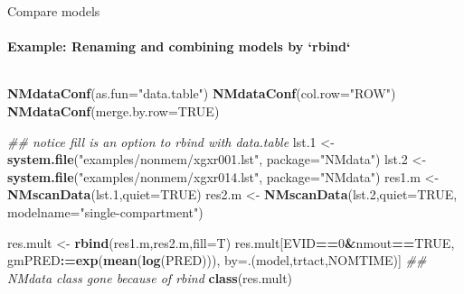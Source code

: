 \documentclass[
  8pt,
  ignorenonframetext,
  aspectratio=169]{beamer}
\newenvironment{Shaded}{\begin{snugshade}}{\end{snugshade}}
\newcommand{\CommentTok}[1]{\textcolor[rgb]{0.56,0.35,0.01}{\textit{#1}}}
\newcommand{\DataTypeTok}[1]{\textcolor[rgb]{0.13,0.29,0.53}{#1}}
\newcommand{\DecValTok}[1]{\textcolor[rgb]{0.00,0.00,0.81}{#1}}
\newcommand{\ErrorTok}[1]{\textcolor[rgb]{0.64,0.00,0.00}{\textbf{#1}}}
\newcommand{\FloatTok}[1]{\textcolor[rgb]{0.00,0.00,0.81}{#1}}
\newcommand{\KeywordTok}[1]{\textcolor[rgb]{0.13,0.29,0.53}{\textbf{#1}}}
\newcommand{\NormalTok}[1]{#1}
\newcommand{\OperatorTok}[1]{\textcolor[rgb]{0.81,0.36,0.00}{\textbf{#1}}}
\newcommand{\OtherTok}[1]{\textcolor[rgb]{0.56,0.35,0.01}{#1}}
\newcommand{\StringTok}[1]{\textcolor[rgb]{0.31,0.60,0.02}{#1}}
\begin{document}
\begin{frame}[fragile]{Compare models}
\protect\hypertarget{compare-models}{}
\framesubtitle{Example: Renaming and combining models by `rbind`}

\begin{columns}[T]
\begin{column}{0.45\textwidth}
\footnotesize

\begin{Shaded}
\begin{Highlighting}[]
\KeywordTok{NMdataConf}\NormalTok{(}\DataTypeTok{as.fun=}\StringTok{"data.table"}\NormalTok{)}
\KeywordTok{NMdataConf}\NormalTok{(}\DataTypeTok{col.row=}\StringTok{"ROW"}\NormalTok{)}
\KeywordTok{NMdataConf}\NormalTok{(}\DataTypeTok{merge.by.row=}\OtherTok{TRUE}\NormalTok{)}
\end{Highlighting}
\end{Shaded}

\begin{Shaded}
\begin{Highlighting}[]
\CommentTok{\#\# notice fill is an option to rbind with data.table}
\NormalTok{lst}\FloatTok{.1}\NormalTok{ \textless{}{-}}\StringTok{ }\KeywordTok{system.file}\NormalTok{(}\StringTok{"examples/nonmem/xgxr001.lst"}\NormalTok{,}
                     \DataTypeTok{package=}\StringTok{"NMdata"}\NormalTok{)}
\NormalTok{lst}\FloatTok{.2}\NormalTok{ \textless{}{-}}\StringTok{ }\KeywordTok{system.file}\NormalTok{(}\StringTok{"examples/nonmem/xgxr014.lst"}\NormalTok{,}
                     \DataTypeTok{package=}\StringTok{"NMdata"}\NormalTok{)}
\NormalTok{res1.m \textless{}{-}}\StringTok{ }\KeywordTok{NMscanData}\NormalTok{(lst}\FloatTok{.1}\NormalTok{,}\DataTypeTok{quiet=}\OtherTok{TRUE}\NormalTok{)}
\NormalTok{res2.m \textless{}{-}}\StringTok{ }\KeywordTok{NMscanData}\NormalTok{(lst}\FloatTok{.2}\NormalTok{,}\DataTypeTok{quiet=}\OtherTok{TRUE}\NormalTok{,}
                     \DataTypeTok{modelname=}\StringTok{"single{-}compartment"}\NormalTok{)}

\NormalTok{res.mult \textless{}{-}}\StringTok{ }\KeywordTok{rbind}\NormalTok{(res1.m,res2.m,}\DataTypeTok{fill=}\NormalTok{T)}
\NormalTok{res.mult[EVID}\OperatorTok{==}\DecValTok{0}\OperatorTok{\&}\NormalTok{nmout}\OperatorTok{==}\OtherTok{TRUE}\NormalTok{,}
\NormalTok{         gmPRED}\OperatorTok{:}\ErrorTok{=}\KeywordTok{exp}\NormalTok{(}\KeywordTok{mean}\NormalTok{(}\KeywordTok{log}\NormalTok{(PRED))),}
\NormalTok{         by=.(model,trtact,NOMTIME)]}
\CommentTok{\#\# NMdata class gone because of rbind}
\KeywordTok{class}\NormalTok{(res.mult)}
\end{Highlighting}
\end{Shaded}


\end{column}
\end{columns}
\end{frame}
\end{document}
